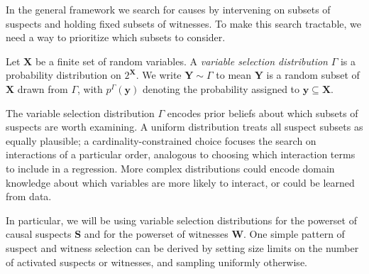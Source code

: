 In the general framework we search for causes by intervening on subsets of suspects
and holding fixed subsets of witnesses. To make this search tractable, we need a way to prioritize which subsets to consider.

\begin{definition}\label{def:variableselection}
Let $\mathbf{X}$ be a finite set of random variables. A \emph{variable selection distribution} $\Gamma$ is a probability distribution on $2^\mathbf{X}$. We write $\mathbf{Y}\sim\Gamma$ to mean $\mathbf{Y}$ is a random subset of $\mathbf{X}$ drawn from $\Gamma$, with $p^\Gamma(\mathbf{y})$ denoting the probability assigned to $\mathbf{y}\subseteq\mathbf{X}$.
\end{definition}

\medskip\noindent The variable selection distribution $\Gamma$ encodes
prior beliefs about which subsets of suspects are worth examining. A uniform distribution
treats all suspect subsets as equally plausible; a cardinality-constrained choice focuses
the search on interactions of a particular order, analogous to choosing which interaction
terms to include in a regression. More complex distributions could encode domain knowledge
about which variables are more likely to interact, or could be learned from data.

\noindent In particular, we will be using variable selection distributions for the powerset of causal suspects $\mathbf{S}$ and for the powerset of witnesses $\mathbf{W}$. One simple pattern of suspect and witness selection can be derived by setting size limits on the number of activated suspects or witnesses, and sampling uniformly otherwise.

